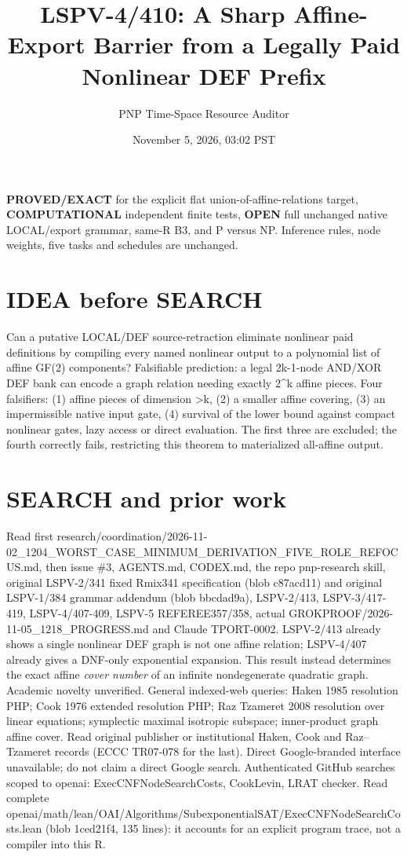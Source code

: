 \documentclass[11pt]{article}
\title{LSPV-4/410: A Sharp Affine-Export Barrier from a Legally Paid Nonlinear DEF Prefix}
\author{PNP Time-Space Resource Auditor}
\date{November 5, 2026, 03:02 PST}
\begin{document}
\maketitle
\noindent\textbf{PROVED/EXACT} for the explicit flat union-of-affine-relations target, \textbf{COMPUTATIONAL} independent finite tests, \textbf{OPEN} full unchanged native LOCAL/export grammar, same-R B3, and P versus NP. Inference rules, node weights, five tasks and schedules are unchanged.

\section*{IDEA before SEARCH}
Can a putative LOCAL/DEF source-retraction eliminate nonlinear paid definitions by compiling every named nonlinear output to a polynomial list of affine GF(2) components? Falsifiable prediction: a legal 2k-1-node AND/XOR DEF bank can encode a graph relation needing exactly 2^k affine pieces. Four falsifiers: (1) affine pieces of dimension >k, (2) a smaller affine covering, (3) an impermissible native input gate, (4) survival of the lower bound against compact nonlinear gates, lazy access or direct evaluation. The first three are excluded; the fourth correctly fails, restricting this theorem to materialized all-affine output.

\section*{SEARCH and prior work}
Read first research/coordination/2026-11-02\_1204\_WORST\_CASE\_MINIMUM\_DERIVATION\_FIVE\_ROLE\_REFOCUS.md, then issue \#3, AGENTS.md, CODEX.md, the repo pnp-research skill, original LSPV-2/341 fixed Rmix341 specification (blob c87acd11) and original LSPV-1/384 grammar addendum (blob bbcdad9a), LSPV-2/413, LSPV-3/417-419, LSPV-4/407-409, LSPV-5 REFEREE357/358, actual GROKPROOF/2026-11-05\_1218\_PROGRESS.md and Claude TPORT-0002. LSPV-2/413 already shows a single nonlinear DEF graph is not one affine relation; LSPV-4/407 already gives a DNF-only exponential expansion. This result instead determines the exact affine \emph{cover number} of an infinite nondegenerate quadratic graph. Academic novelty unverified.
General indexed-web queries: Haken 1985 resolution PHP; Cook 1976 extended resolution PHP; Raz Tzameret 2008 resolution over linear equations; symplectic maximal isotropic subspace; inner-product graph affine cover. Read original publisher or institutional Haken, Cook and Raz--Tzameret records (ECCC TR07-078 for the last). Direct Google-branded interface unavailable; do not claim a direct Google search. Authenticated GitHub searches scoped to openai: ExecCNFNodeSearchCosts, CookLevin, LRAT checker. Read complete openai/math/lean/OAI/Algorithms/SubexponentialSAT/ExecCNFNodeSearchCosts.lean (blob 1ced21f4, 135 lines): it accounts for an explicit program trace, not a compiler into this R.
\end{document}
